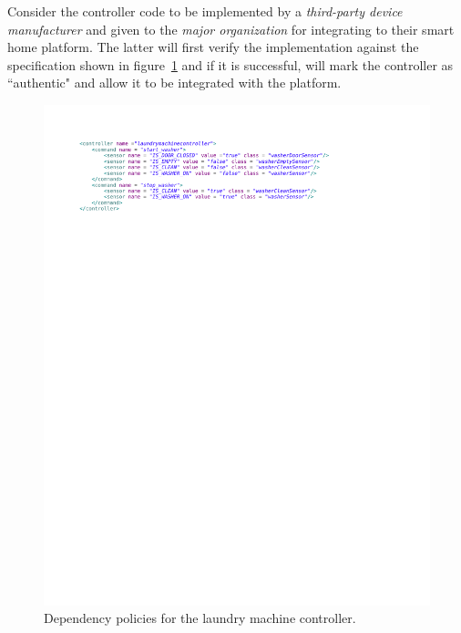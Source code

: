 \documentclass{article}
\begin{document}
Consider the controller code to be implemented by a \textit{third-party device manufacturer} and given to the \textit{major organization} for integrating to their smart home platform. The latter will first verify the implementation against the specification shown in figure~\ref{fig:policy} and if it is successful, will mark the controller as ``authentic" and allow it to be integrated with the platform.\\

\begin{figure}[h]
\begin{center}
\includegraphics[scale=0.7, trim = 0 21.5cm 0 2cm]{policy.pdf}
\caption{Dependency policies for the laundry machine controller.}
\label{fig:policy}
\end{center}
\end{figure}
\end{document}

